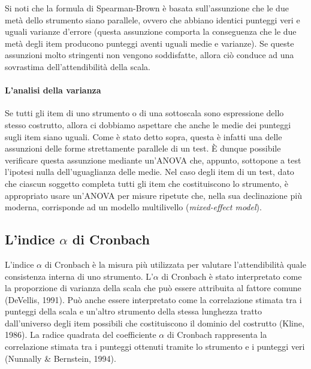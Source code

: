 \documentclass[
  11pt,
]{krantz}
\theoremstyle{definition}
\theoremstyle{definition}
\theoremstyle{definition}
\theoremstyle{definition}
\theoremstyle{remark}
\begin{document}
Si noti che la formula di Spearman-Brown è basata sull'assunzione che le due metà dello strumento siano parallele, ovvero che abbiano identici punteggi veri e uguali varianze d'errore (questa assunzione comporta la conseguenza che le due metà degli item producono punteggi aventi uguali medie e varianze). Se queste assunzioni molto stringenti non vengono soddisfatte, allora ciò conduce ad una sovrastima dell'attendibilità della scala.

\hypertarget{lanalisi-della-varianza}{%
\paragraph{L'analisi della varianza}\label{lanalisi-della-varianza}}

Se tutti gli item di uno strumento o di una sottoscala sono espressione dello stesso costrutto, allora ci dobbiamo aspettare che anche le medie dei punteggi sugli item siano uguali. Come è stato detto sopra, questa è infatti una delle assunzioni delle forme strettamente parallele di un test. È dunque possibile verificare questa assunzione mediante un'ANOVA che, appunto, sottopone a test l'ipotesi nulla dell'uguaglianza delle medie. Nel caso degli item di un test, dato che ciascun soggetto completa tutti gli item che costituiscono lo strumento, è appropriato usare un'ANOVA per misure ripetute che, nella sua declinazione più moderna, corrisponde ad un modello multilivello (\emph{mixed-effect model}).

\hypertarget{lindice-alpha-di-cronbach}{%
\subsection{\texorpdfstring{L'indice \(\alpha\) di Cronbach}{L'indice \textbackslash alpha di Cronbach}}\label{lindice-alpha-di-cronbach}}

L'indice \(\alpha\) di Cronbach è la misura più utilizzata per valutare l'attendibilità quale consistenza interna di uno strumento. L'\(\alpha\) di Cronbach è stato interpretato come la proporzione di varianza della scala che può essere attribuita al fattore comune (DeVellis, 1991). Può anche essere interpretato come la correlazione stimata tra i punteggi della scala e un'altro strumento della stessa lunghezza tratto dall'universo degli item possibili che costituiscono il dominio del costrutto (Kline, 1986). La radice quadrata del coefficiente \(\alpha\) di Cronbach rappresenta la correlazione stimata tra i punteggi ottenuti tramite lo strumento e i punteggi veri (Nunnally \& Bernstein, 1994).
\end{document}
